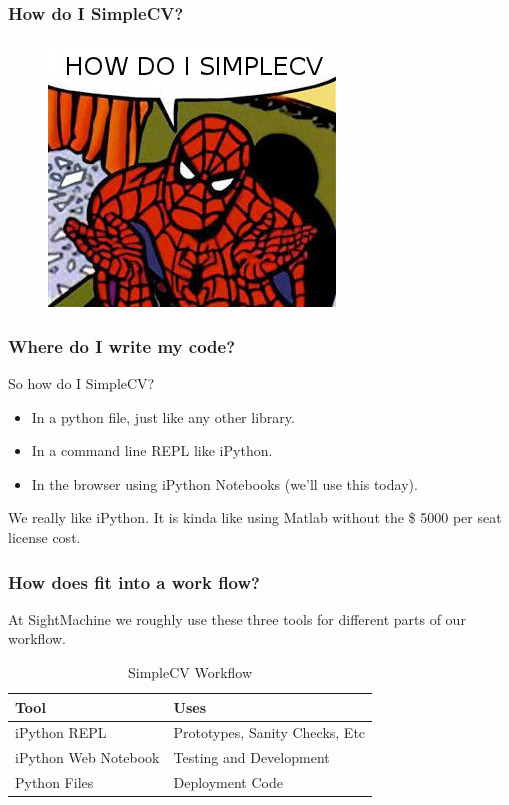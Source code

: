 \documentclass{beamer}
\begin{document}
\begin{frame}
\frametitle{How do I SimpleCV?}

\begin{figure}
  \includegraphics[width=0.6\linewidth]{howdoi.jpg}
\end{figure}

\end{frame}

 
\begin{frame}
\frametitle{Where do I write my code?}

\large{So how do I SimpleCV?}
\begin{itemize}
\item In a python file, just like any other library.
\item In a command line REPL like iPython.
\item In the browser using iPython Notebooks (we'll use this today).
\end{itemize}
We really like iPython. It is kinda like using Matlab without the \$ 5000
per seat license cost. 
\end{frame}


\begin{frame}
\frametitle{How does fit into a work flow?}
At SightMachine we roughly use these three tools 
for different parts of our workflow.
\begin{table}
\begin{tabular}{l l }
\toprule
\textbf{Tool} & \textbf{Uses} \\
\midrule
iPython REPL & Prototypes, Sanity Checks, Etc \\
iPython Web Notebook & Testing and Development \\
Python Files  & Deployment Code \\
\bottomrule
\end{tabular}
\caption{SimpleCV Workflow}
\end{table}
\end{frame}
\end{document}
